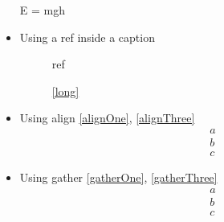 \documentclass{article}
\def\ifautonum#1{#1}%
\def\ifautonum#1{}%
\def\ifcleveref#1{#1}%
\def\ifcleveref#1{}%
\begin{document}
\begin{itemize}
{\begin{equation+}
					E = mgh
				\end{equation+}
		}
		\item Using a ref inside a caption
			\begin{figure}
				ref
				\caption{\ref{long}}
			\end{figure}
		\ifcleveref{
			\item Using a cref inside a caption
				\begin{figure}
					cref
					\caption{\cref{long}}
				\end{figure}
			\item Using cref with one argument
				\begin{equation}\label{crefOne}
					g
				\end{equation}
				\cref{crefOne}
			\item Using cref with two arguments
				\begin{equation}\label{crefTwo}
					cr = ef
				\end{equation}
				\cref{crefOne,crefTwo}
			\ifautonum{
				\item Using otherwise unused cref with two arguments (needs autonum)
					\[\label{crefThree}
						cr = ef
					\]
					\[\label{crefFour}
						cr = ef
					\]
					\cref{crefThree,crefFour}
			}
			\item Using cref with a custom type \cref{myInequation} and thus an optional argument in the label command
				\begin{equation}\label[inequation]{myInequation}
					a < b
				\end{equation}
			\item Using an unused cref with a custom type and thus an optional argument in the label command
				\begin{equation}\label[inequation]{myUnusedInequation}
					d < c
				\end{equation}
		}
		\item Using align \ref{alignOne}, \ref{alignThree}
			\begin{align}
				a\label{alignOne}\\
				b\label{alignTwo}\\
				c\label{alignThree}
			\end{align}
		\item Using gather \ref{gatherOne}, \ref{gatherThree}
			\begin{gather}
				a\label{gatherOne}\\
				b\label{gatherTwo}\\
				c\label{gatherThree}
			\end{gather}

\end{itemize}
\end{document}
